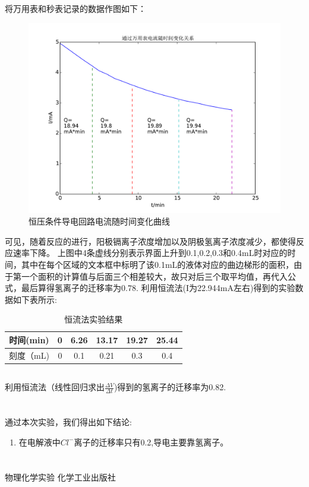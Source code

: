 ﻿\documentclass[10.5pt]{ctexart}
\begin{document}
\subsection{\textbf{}}
将万用表和秒表记录的数据作图如下：
\begin{figure}[!ht]
\centering
\caption{恒压条件导电回路电流随时间变化曲线}
\includegraphics[width=400pt]{pc_2.pdf}
\end{figure}
可见，随着反应的进行，阳极镉离子浓度增加以及阴极氢离子浓度减少，都使得反应速率下降。
上图中4条虚线分别表示界面上升到0.1,0.2,0.3和0.4mL时对应的时间，其中在每个区域的文本框中标明了该0.1mL的液体对应的曲边梯形的面积，由于第一个面积的计算值与后面三个相差较大，故只对后三个取平均值，再代入公式，最后算得氢离子的迁移率为0.78.
利用恒流法(I为22.944mA左右)得到的实验数据如下表所示:
\begin{table}[!ht]
\centering
\caption{恒流法实验结果}
\begin{tabular}{cccccc}
\hline
时间(min) & 0 & 6.26 & 13.17 & 19.27 & 25.44  \\
\hline
刻度（mL) & 0 & 0.1 & 0.21 & 0.3 & 0.4\\
\hline
\end{tabular}
\end{table}

\subsection{\textbf{}}
利用恒流法（线性回归求出$\frac{\Delta V}{\Delta t}$)得到的氢离子的迁移率为0.82.



\section{\textbf{}}

通过本次实验，我们得出如下结论:
\begin{enumerate}
\item 在电解液中$Cl^-$离子的迁移率只有0.2,导电主要靠氢离子。
\end{enumerate}

\section{\textbf{}}
\begin{thebibliography}{}
物理化学实验 \quad 化学工业出版社
\end{thebibliography}
\end{document}
